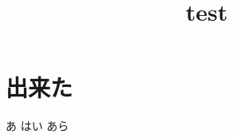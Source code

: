\documentclass[a4j, 12pt]{jreport}
\title{test}
\begin{document}
\maketitle
\section{出来た}
あ
はい
あら
\end{document}
